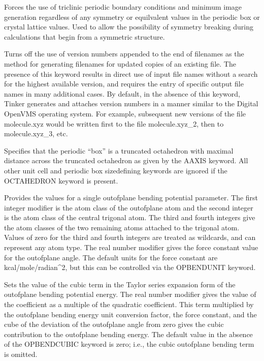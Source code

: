 \documentclass[letterpaper,11pt,english]{sphinxmanual}
\begin{document}
  Forces the use of triclinic periodic boundary conditions and minimum image generation regardless of any symmetry or equilvalent values in the periodic box or crystal lattice values. Used to allow the possibility of symmetry breaking during calculations that begin from a symmetric structure.

  Turns off the use of version numbers appended to the end of filenames as the method for generating filenames for updated copies of an existing file. The presence of this keyword results in direct use of input file names without a search for the highest available version, and requires the entry of specific output file names in many additional cases. By default, in the absence of this keyword, Tinker generates and attaches version numbers in a manner similar to the Digital OpenVMS operating system. For example, subsequent new versions of the file molecule.xyz would be written first to the file molecule.xyz\_2, then to molecule.xyz\_3, etc.

  Specifies that the periodic “box” is a truncated octahedron with maximal distance across the truncated octahedron as given by the A\sphinxhyphen{}AXIS keyword. All other unit cell and periodic box size\sphinxhyphen{}defining keywords are ignored if the OCTAHEDRON keyword is present.

  Provides the values for a single out\sphinxhyphen{}of\sphinxhyphen{}plane bending potential parameter. The first integer modifier is the atom class of the out\sphinxhyphen{}of\sphinxhyphen{}plane atom and the second integer is the atom class of the central trigonal atom. The third and fourth integers give the atom classes of the two remaining atoms attached to the trigonal atom. Values of zero for the third and fourth integers are treated as wildcards, and can represent any atom type. The real number modifier gives the force constant value for the out\sphinxhyphen{}of\sphinxhyphen{}plane angle. The default units for the force constant are kcal/mole/radian\textasciicircum{}2, but this can be controlled via the OPBENDUNIT keyword.

  Sets the value of the cubic term in the Taylor series expansion form of the out\sphinxhyphen{}of\sphinxhyphen{}plane bending potential energy. The real number modifier gives the value of the coefficient as a multiple of the quadratic coefficient. This term multiplied by the out\sphinxhyphen{}of\sphinxhyphen{}plane bending energy unit conversion factor, the force constant, and the cube of the deviation of the out\sphinxhyphen{}of\sphinxhyphen{}plane angle from zero gives the cubic contribution to the out\sphinxhyphen{}of\sphinxhyphen{}plane bending energy. The default value in the absence of the OPBEND\sphinxhyphen{}CUBIC keyword is zero; i.e., the cubic out\sphinxhyphen{}of\sphinxhyphen{}plane bending term is omitted.
\end{document}
